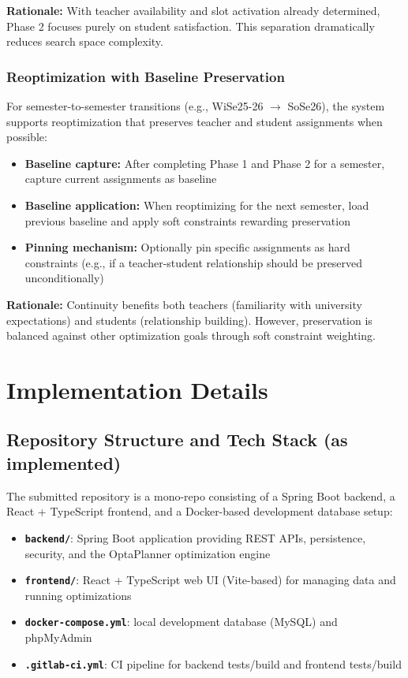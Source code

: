 \documentclass[12pt,a4paper]{report}
\begin{document}
\textbf{Rationale:} With teacher availability and slot activation already determined, Phase 2 focuses purely on student satisfaction. This separation dramatically reduces search space complexity.

\subsection{Reoptimization with Baseline Preservation}

For semester-to-semester transitions (e.g., WiSe25-26 $\rightarrow$ SoSe26), the system supports reoptimization that preserves teacher and student assignments when possible:

\begin{itemize}
    \item \textbf{Baseline capture:} After completing Phase 1 and Phase 2 for a semester, capture current assignments as baseline
    \item \textbf{Baseline application:} When reoptimizing for the next semester, load previous baseline and apply soft constraints rewarding preservation
    \item \textbf{Pinning mechanism:} Optionally pin specific assignments as hard constraints (e.g., if a teacher-student relationship should be preserved unconditionally)
\end{itemize}

\textbf{Rationale:} Continuity benefits both teachers (familiarity with university expectations) and students (relationship building). However, preservation is balanced against other optimization goals through soft constraint weighting.


\chapter{Implementation Details}

\section{Repository Structure and Tech Stack (as implemented)}

The submitted repository is a mono-repo consisting of a Spring Boot backend, a React + TypeScript frontend, and a Docker-based development database setup:

\begin{itemize}
    \item \textbf{\texttt{backend/}}: Spring Boot application providing REST APIs, persistence, security, and the OptaPlanner optimization engine
    \item \textbf{\texttt{frontend/}}: React + TypeScript web UI (Vite-based) for managing data and running optimizations
    \item \textbf{\texttt{docker-compose.yml}}: local development database (MySQL) and phpMyAdmin
    \item \textbf{\texttt{.gitlab-ci.yml}}: CI pipeline for backend tests/build and frontend tests/build
\end{itemize}
\end{document}

